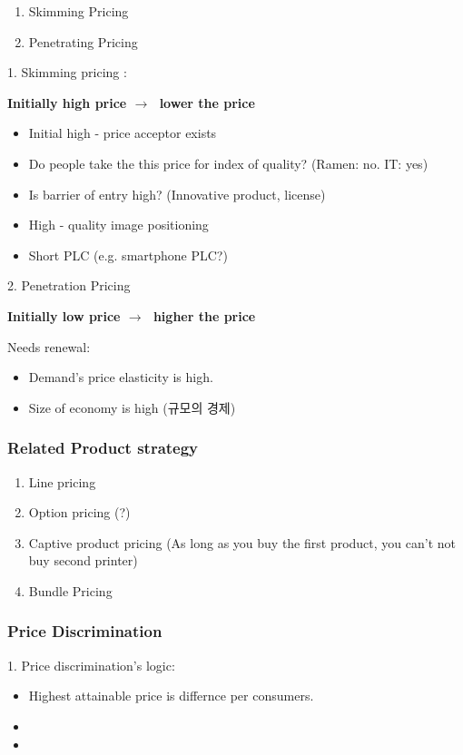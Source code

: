 \documentclass[12pt]{article}
\newcommand{\ra}{$\rightarrow \text{ }$}
\newcommand{\tb}{\textbf}
\begin{document}
\begin{itemize}
\begin{enumerate}
	\item Skimming Pricing
	\item Penetrating Pricing
\end{enumerate}

1. Skimming pricing :

\tb{Initially high price \ra lower the price}

\begin{itemize}
	\item Initial high - price acceptor exists
	\item Do people take the this price for index of quality? (Ramen: no. IT: yes)
	\item Is barrier of entry high? (Innovative product, license)
	\item High - quality image positioning
	\item Short PLC (e.g. smartphone PLC?)
\end{itemize}

2. Penetration Pricing

\tb{Initially low price \ra higher the price}

Needs renewal:
\begin{itemize}
	\item Demand's price elasticity is high.
	\item Size of economy is high (규모의 경제)
\end{itemize}


\subsubsection{Related Product strategy}

\begin{enumerate}
	\item Line pricing
	\item Option pricing (?)
	\item Captive product pricing  (As long as you buy the first product, you can't not buy second printer)
	\item Bundle Pricing
\end{enumerate}

\subsubsection{Price Discrimination}

1. Price discrimination's logic:
\begin{itemize}
	\item Highest attainable price is differnce per consumers.
	\item
	\item
\end{itemize}


\end{itemize}
\end{document}

